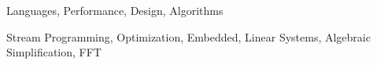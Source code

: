 
\begin{terms}
Languages, Performance, Design, Algorithms
\end{terms}

\begin{keywords}
Stream Programming, Optimization, Embedded, Linear Systems, Algebraic Simplification, FFT
\end{keywords}
